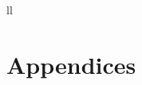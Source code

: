 \cleardoublepage
\backmatter
{}






\listoffigures %

\listoftables %


\begin{abbreviations}{ll} %

\printglossary
\glsaddall
\end{abbreviations}




\appendix %
\chapter{Appendices}
\setcounter{secnumdepth}{3}
\renewcommand{\thechapter}{A}







